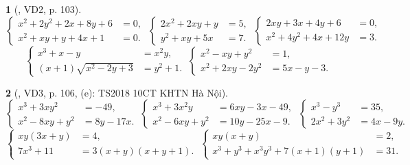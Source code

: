 \documentclass{article}
\newtheorem{baitoan}{}
\begin{document}
\begin{baitoan}[\cite{Kien_dai_so_9}, VD2, p. 103]
	\begin{equation*}
		\left\{\begin{split}
			x^2 + 2y^2 + 2x + 8y + 6 &= 0,\\
			x^2 + xy + y + 4x + 1 &= 0.
		\end{split}\right.\ \left\{\begin{split}
			2x^2 + 2xy + y &= 5,\\
			y^2 + xy + 5x &= 7.
		\end{split}\right.\ \left\{\begin{split}
			2xy + 3x + 4y + 6 &= 0,\\
			x^2 + 4y^2 + 4x + 12y &= 3.
		\end{split}\right.
	\end{equation*}
	\begin{equation*}
		\left\{\begin{split}
			x^3 + x - y &= x^2y,\\
			(x + 1)\sqrt{x^2 - 2y + 3} &= y^2 + 1.
		\end{split}\right.\ \left\{\begin{split}
			x^2 - xy + y^2 &= 1,\\
			x^2 + 2xy - 2y^2 &= 5x - y - 3.
		\end{split}\right.
	\end{equation*}
\end{baitoan}

\begin{baitoan}[\cite{Kien_dai_so_9}, VD3, p. 106, (e): TS2018 10CT KHTN Hà Nội]
	\begin{equation*}
		\left\{\begin{split}
			x^3 + 3xy^2 &= -49,\\
			x^2 - 8xy + y^2 &= 8y - 17x.
		\end{split}\right.\ \left\{\begin{split}
			x^3 + 3x^2y &= 6xy - 3x - 49,\\
			x^2 - 6xy + y^2 &= 10y - 25x - 9.
		\end{split}\right.\ \left\{\begin{split}
			x^3 - y^3 &= 35,\\
			2x^2 + 3y^2 &= 4x - 9y.
		\end{split}\right.
	\end{equation*}
	\begin{equation*}
		\left\{\begin{split}
			xy(3x + y) &= 4,\\
			7x^3 + 11 &= 3(x + y)(x + y + 1).
		\end{split}\right.\ \left\{\begin{split}
			xy(x + y) &= 2,\\
			x^3 + y^3 + x^3y^3 + 7(x + 1)(y + 1) &= 31.
		\end{split}\right.
	\end{equation*}
\end{baitoan}
\end{document}

